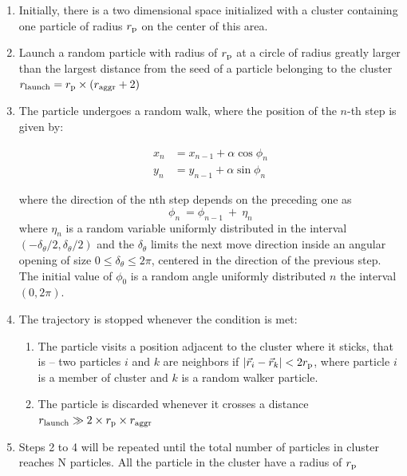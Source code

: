 \documentclass[aps,preprint,groupedaddress,letterpaper]{revtex4-1}
\begin{document}
\begin{enumerate}
    \item Initially, there is a two dimensional space initialized with a cluster containing one particle of radius $r_{\rm p}$ on the center of this area.
    
    \item Launch a random particle with radius of $r_{\rm p}$ at a circle of radius greatly larger than the largest distance from the seed of a particle belonging to the cluster $r_{\rm launch}= r_{\rm p} \times (r_{\rm aggr}+2)$
    
    \item The particle undergoes a random walk, where the position of the $n$-th step is given by:
    
    \begin{equation} \label{off}
    \begin{split}
    x_n &=x_{n-1} + \alpha\cos{\phi_n} \\
    y_n &=y_{n-1} + \alpha\sin{\phi_n}
    \end{split}
    \end{equation}
    
    where the direction of the nth step depends on the preceding one as
    \begin{equation}
        \phi_n\ = \phi_{n-1}\ +\ \eta_n
    \end{equation}
    where $\eta_n$ is a random variable uniformly distributed in the interval $\left(-\delta_\theta/2,\delta_\theta/2\right)$ and the $\delta_\theta$ limits the next move direction inside an angular opening of size $0 \le \delta_\theta\le2\pi$, centered in the direction of the previous step. The initial value of $\phi_0$ is a random angle uniformly distributed $n$ the interval $(0,2\pi)$.
    
    \item The trajectory is stopped whenever the condition is met:
    \begin{enumerate}
        \item The particle visits a position adjacent to the cluster where it sticks, that is -- two particles $i$ and $k$ are neighbors if $|\vec{r}_i-\vec{r}_k| < 2 r_{\rm p}$, where particle $i$ is a member of cluster and $k$ is a random walker particle.
        \item The particle is discarded whenever it crosses a distance $r_{\rm launch}\gg 2\times r_{\rm p} \times r_{\rm aggr}$
    \end{enumerate}
    
    \item Steps 2 to 4 will be repeated until the total number of particles in cluster reaches N particles. All the particle in the cluster have a radius of $r_{\rm p}$
    
\end{enumerate}
\end{document}
